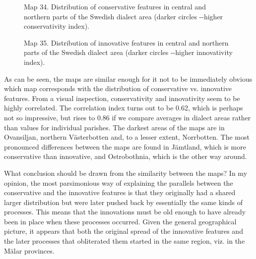 \clearpage%


\begin{figure}[h]
\centering
\begin{minipage}{6.27083in}
Map 34. Distribution of conservative features in central and northern parts of the Swedish dialect\newline
 area (darker circles -{}-higher conservativity index).
\end{minipage}
\end{figure}
\clearpage%


\begin{figure}[h]
\centering
\begin{minipage}{6.30208in}
Map 35. Distribution of innovative features in central and northern parts of the Swedish\newline
 dialect area (darker circles -{}-higher innovativity index).
\end{minipage}
\end{figure}
\clearpage%
As can be seen, the maps are similar enough for it not to be immediately obvious which map corresponds with the distribution of conservative vs. innovative features. From a visual inspection, conservativity and innovativity seem to be highly correlated. The correlation index turns out to be 0.62, which is perhaps not so impressive, but rises to 0.86 if we compare averages in dialect areas rather than values for individual parishes. The darkest areas of the maps are in Ovansiljan, northern Västerbotten and, to a lesser extent, Norrbotten. The most pronounced differences between the maps are found in Jämtland, which is more conservative than innovative, and Ostrobothnia, which is the other way around. 


What conclusion should be drawn from the similarity between the maps? In my opinion, the most parsimonious way of explaining the parallels between the conservative and the innovative features is that they originally had a shared larger distribution but were later pushed back by essentially the same kinds of processes. This means that the innovations must be old enough to have already been in place when these processes occurred. Given the general geographical picture, it appears that both the original spread of the innovative features and the later processes that obliterated them started in the same region, viz. in the Mälar provinces. 

